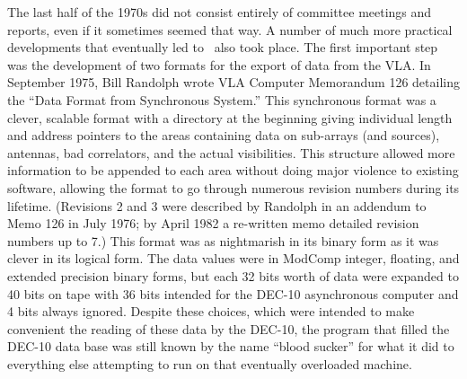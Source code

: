 The last half of the 1970s did not consist entirely of committee
meetings and reports, even if it sometimes seemed that way.  A number
of much more practical developments that eventually led to \AIPS\ also
took place.  The first important step was the development of two
formats for the export of data from the \hbox{VLA}.  In September
1975, Bill Randolph wrote VLA Computer Memorandum 126 detailing the
``Data Format from Synchronous System.''  This synchronous format was
a clever, scalable format with a directory at the beginning giving
individual length and address pointers to the areas containing data on
sub-arrays (and sources), antennas, bad correlators, and the actual
visibilities.  This structure allowed more information to be appended
to each area without doing major violence to existing software,
allowing the format to go through numerous revision numbers during its
lifetime.  (Revisions 2 and 3 were described by Randolph in an
addendum to Memo 126 in July 1976; by April 1982 a re-written memo
detailed revision numbers up to 7.)  This format was as nightmarish in
its binary form as it was clever in its logical form.  The data values
were in ModComp integer, floating, and extended precision binary
forms, but each 32 bits worth of data were expanded to 40 bits on tape
with 36 bits intended for the DEC-10 asynchronous computer and 4 bits
always ignored.  Despite these choices, which were intended to make
convenient the reading of these data by the DEC-10, the program that
filled the DEC-10 data base was still known by the name ``blood
sucker'' for what it did to everything else attempting to run on that
eventually overloaded machine.

